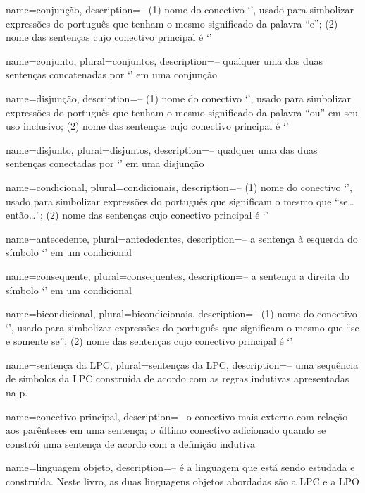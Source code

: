 {
name=conjunção,
description={-- (1) nome do conectivo `\eand', usado para simbolizar expressões do português que tenham o mesmo significado da palavra ``e''; (2) nome das sentenças cujo conectivo principal é `\eand'}
}

{
name=conjunto,
plural=conjuntos,
description={-- qualquer uma das duas sentenças concatenadas por `\eand' em uma conjunção}
}

{
name=disjunção,
description={-- (1) nome do conectivo `\eor', usado para simbolizar expressões do português que tenham o mesmo significado da palavra ``ou'' em seu uso inclusivo; (2) nome das sentenças cujo conectivo principal é `\eor'}
}

{
name=disjunto,
plural=disjuntos,
description={-- qualquer uma das duas sentenças conectadas por `\eor' em uma disjunção}
}

{
name=condicional,
plural=condicionais,
description={-- (1) nome do conectivo `\eif', usado para simbolizar expressões do português que significam o mesmo que ``se\ldots{}então\ldots''; (2) nome das sentenças cujo conectivo principal é `\eif'}
}

{
name=antecedente,
plural=antededentes,
description={-- a sentença à esquerda do símbolo `\eif' em um condicional}
}

{
name=consequente,
plural=consequentes,
description={-- a sentença a direita do símbolo `\eif' em um condicional}
}

{
name=bicondicional,
plural=bicondicionais,
description={-- (1) nome do conectivo `\eiff', usado para simbolizar expressões do português que significam o mesmo que ``se e somente se''; (2) nome das sentenças cujo conectivo principal é `\eiff'}
}

{
name=sentença da LPC,
plural=sentenças da LPC,
description={-- uma sequência de símbolos da LPC construída de acordo com as regras indutivas apresentadas na p.~\pageref{TFLsentences}}
}

{
name=conectivo principal,
description={-- o conectivo mais externo com relação aos parênteses em uma sentença; o último conectivo adicionado quando se constrói uma sentença de acordo com a definição indutiva}
}

{
name=linguagem objeto,
description={-- é a linguagem que está sendo estudada e construída. Neste livro, as duas linguagens objetos abordadas são a LPC e a LPO}
}

